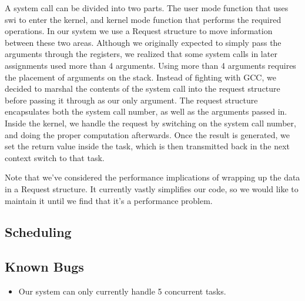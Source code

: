 \documentclass{article}
\begin{document}
A system call can be divided into two parts. The user mode function that uses swi to enter the kernel, and kernel mode function that performs the required operations. In our system we use a Request structure to move information between these two areas. Although we originally expected to simply pass the arguments through the registers, we realized that some system calls in later assignments used more than 4 arguments. Using more than 4 arguments requires the placement of arguments on the stack. Instead of fighting with GCC, we decided to marshal the contents of the system call into the request structure before passing it through as our only argument. The request structure encapsulates both the system call number, as well as the arguments passed in. Inside the kernel, we handle the request by switching on the system call number, and doing the proper computation afterwards. Once the result is generated, we set the return value inside the task, which is then transmitted back in the next context switch to that task.

Note that we've considered the performance implications of wrapping up the data in a Request structure. It currently vastly simplifies our code, so we would like to maintain  it until we find that it's a performance problem.

\subsection{Scheduling}

\subsection{Known Bugs}
\begin{itemize}
  \item Our system can only currently handle 5 concurrent tasks.
\end{itemize}
\end{document}
